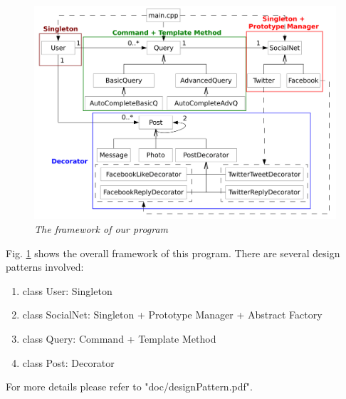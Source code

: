 \documentclass[12pt]{article}
\begin{document}
\begin{figure}[t]
\centering
\includegraphics[width=15cm]{doc/classDiagram}
\caption{{\it The framework of our program}}
\label{fig:classDiagram}
\end{figure}

Fig. \ref{fig:classDiagram} shows the overall framework of this program. There are several design patterns involved:
\begin{enumerate}
\item class User: Singleton
\item class SocialNet: Singleton + Prototype Manager + Abstract Factory
\item class Query: Command + Template Method
\item class Post: Decorator 
\end{enumerate}
For more details please refer to "doc/designPattern.pdf".
\end{document}
